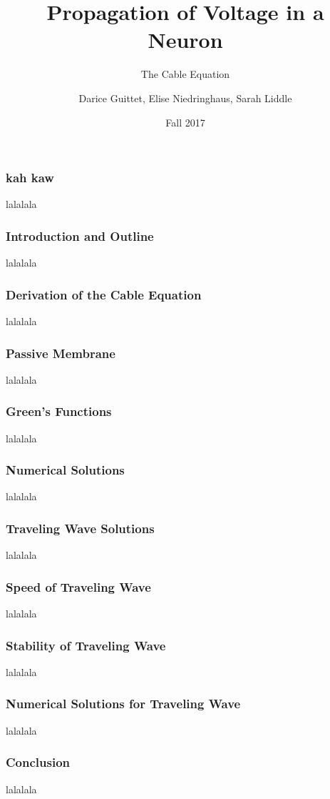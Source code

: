 \documentclass{beamer}
\title{Propagation of Voltage in a Neuron}
\subtitle{The Cable Equation}
\author{Darice Guittet, Elise Niedringhaus, Sarah Liddle}
\date{Fall 2017}
\begin{document}
 
\frame{\titlepage}
 
\begin{frame}
\frametitle{kah kaw}
lalalala
\end{frame}

\begin{frame}
\frametitle{Introduction and Outline}
lalalala
\end{frame}

\begin{frame}
\frametitle{Derivation of the Cable Equation}
lalalala
\end{frame}

\begin{frame}
\frametitle{Passive Membrane}
lalalala
\end{frame}

\begin{frame}
\frametitle{Green's Functions}
lalalala
\end{frame}

\begin{frame}
\frametitle{Numerical Solutions}
lalalala
\end{frame}

\begin{frame}
\frametitle{Traveling Wave Solutions}
lalalala
\end{frame}

\begin{frame}
\frametitle{Speed of Traveling Wave}
lalalala
\end{frame}

\begin{frame}
\frametitle{Stability of Traveling Wave}
lalalala
\end{frame}

\begin{frame}
\frametitle{Numerical Solutions for Traveling Wave}
lalalala
\end{frame}

\begin{frame}
\frametitle{Conclusion}
lalalala
\end{frame}
\end{document}
